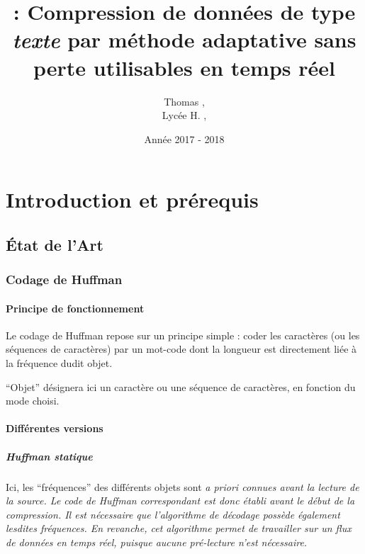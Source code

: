 \documentclass[a4paper, 11pt, twoside]{book}
\begin{document}
    \title{ : Compression de données de type \emph{texte} par méthode adaptative sans perte utilisables en temps réel}
    \author{Thomas , \\
    Lycée H. , }
    \date{Année 2017 - 2018}

    \maketitle
    \tableofcontents

    \part{Introduction et prérequis}

    \chapter{\'Etat de l'Art}

    \section{Codage de Huffman}

    \subsection{Principe de fonctionnement}

    Le codage de Huffman repose sur un principe simple : coder les caractères (ou les séquences de caractères) par un mot-code dont la longueur est directement liée à la fréquence dudit objet.

    ``Objet'' désignera ici un caractère ou une séquence de caractères, en fonction du mode choisi.

    \subsection{Différentes versions}

    \subsubsection{Huffman statique}

    Ici, les ``fréquences'' des différents objets sont \it{a priori} connues avant la lecture de la source. Le code de Huffman correspondant est donc établi avant le début de la compression. Il est nécessaire que l'algorithme de décodage possède également lesdites fréquences. En revanche, cet algorithme permet de travailler sur un flux de données en temps réel, puisque aucune pré-lecture n'est nécessaire.
\end{document}
